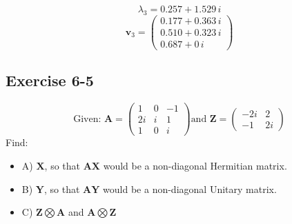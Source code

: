 \documentclass{article}
\begin{document}
            \[
                \lambda_3 = 0.257 + 1.529\,i
            \]
            \[
                \mathbf{v}_3 = \begin{pmatrix}
                0.177 + 0.363\,i \\
                0.510 + 0.323\,i \\
                0.687 + 0\,i
                \end{pmatrix}
            \]
            
            
        \subsection*{Exercise 6-5}
            \[
                \text{Given: }
                \mathbf{A} = \begin{pmatrix}1 & 0 & -1 \\2i  & i  & 1 \\ 1 & 0 & i \end{pmatrix}
                \text{and }
                \mathbf{Z} = \begin{pmatrix} -2i & 2 \\ -1 & 2i \end{pmatrix}
            \]
            Find:
            \begin{itemize}
                \item A) $\mathbf{X}$, so that $\mathbf{AX}$ would be a non-diagonal Hermitian matrix.
                \item B) $\mathbf{Y}$, so that $\mathbf{AY}$ would be a non-diagonal Unitary matrix.
                \item C) $\mathbf{Z} \bigotimes \mathbf{A}$ and $\mathbf{A} \bigotimes \mathbf{Z}$
            \end{itemize}
\end{document}
